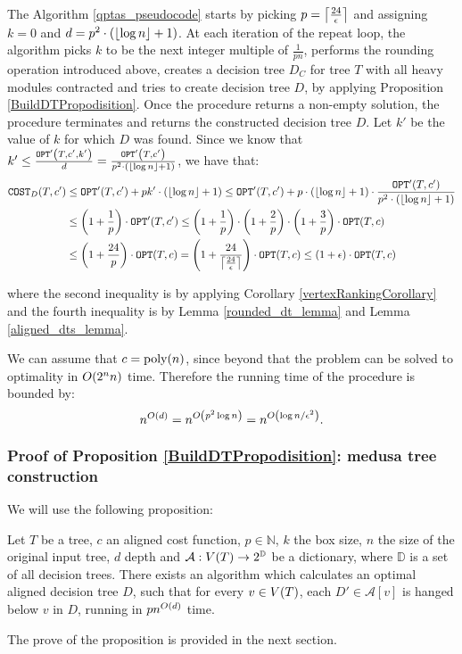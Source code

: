The Algorithm \ref{qptas_pseudocode} starts by picking $p=\mathopen{}\left\lceil \frac{24}{\epsilon} \right\rceil$ and assigning $k=0$ and $d=p^2\cdot\mathopen{}\left( \mathopen{}\left\lfloor \log n \right\rfloor+1 \right)$. At each iteration of the repeat loop, the algorithm picks $k$ to be the next 
integer multiple of $\frac{1}{pn}$, performs the rounding operation introduced above, creates a decision tree $D_C$ for tree $T$ with all heavy modules contracted and tries to create decision tree $D$, by applying Proposition \ref{BuildDTPropodisition}. Once the \FBuildDt procedure returns a non-empty solution, the \FQPTAS procedure terminates and returns the constructed decision tree $D$. Let $k'$ be the value of $k$ for which $D$ was found. Since we know that $k'\leq \frac{\texttt{OPT}'\mathopen{}\left( T,c',k' \right)}{d}=\frac{\texttt{OPT}'\mathopen{}\left( T,c' \right)}{p^2\cdot\mathopen{}\left( \mathopen{}\left\lfloor \log n \right\rfloor+1 \right)}$, we have that:
\begin{align*}
    \texttt{COST}_{D}\mathopen{}\left( T,c' \right)&\leq \texttt{OPT}'\mathopen{}\left( T,c' \right)+pk'\cdot \mathopen{}\left( \mathopen{}\left\lfloor \log n \right\rfloor+1 \right)\leq \texttt{OPT}'\mathopen{}\left( T,c' \right)+p\cdot \mathopen{}\left( \mathopen{}\left\lfloor \log n \right\rfloor+1 \right)\cdot \frac{\texttt{OPT}'\mathopen{}\left( T,c' \right)}{p^2\cdot\mathopen{}\left( \mathopen{}\left\lfloor \log n \right\rfloor+1 \right)} \\
    & \leq \mathopen{}\left( 1+\frac{1}{p} \right)\cdot\texttt{OPT}'\mathopen{}\left( T,c' \right)\leq \mathopen{}\left( 1+\frac{1}{p} \right)\cdot\mathopen{}\left( 1+\frac{2}{p} \right)\cdot\mathopen{}\left( 1+\frac{3}{p} \right)\cdot\texttt{OPT}\mathopen{}\left( T,c \right)
    \\&
    \leq \mathopen{}\left( 1+\frac{24}{p} \right)\cdot\texttt{OPT}\mathopen{}\left( T,c \right) = \mathopen{}\left( 1+\frac{24}{\mathopen{}\left\lceil \frac{24}{\epsilon} \right\rceil} \right)\cdot\texttt{OPT}\mathopen{}\left( T,c \right)\leq \mathopen{}\left( 1+\epsilon \right)\cdot \texttt{OPT}\mathopen{}\left( T,c \right)
\end{align*}
    
where the second inequality is by applying Corollary \ref{vertexRankingCorollary} and the fourth inequality is by Lemma \ref{rounded_dt_lemma} and Lemma \ref{aligned_dts_lemma}.

We can assume that $c=\text{poly}\mathopen{}\left( n \right)$, since beyond that the problem can be solved to optimality in $O\mathopen{}\left( 2^nn \right)$ time. Therefore the running time of the procedure is bounded by:
$$
n^{O\mathopen{}\left( d \right)}=n^{O\mathopen{}\left( p^2\log n \right)}=n^{O\mathopen{}\left( \log n/\epsilon^2 \right)}.
$$
\subsubsection{Proof of Proposition \ref{BuildDTPropodisition}: medusa tree construction}

We will use the following proposition:

\begin{proposition}\label{DPTimelinesCostsProposition}
    Let $T$ be a tree, $c$ an aligned cost function, $p\in \mathbb{N}$, $k$ the box size, $n$ the size of the original input tree, $d$ depth and $\mathcal{A}:V\mathopen{}\left( T \right)\to 2^{\mathbb{D}}$ be a dictionary, where $\mathbb{D}$ is a set of all decision trees. There exists an algorithm \FDPTimelinesCosts which calculates an optimal aligned decision tree $D$, such that for every $v\in V\mathopen{}\left( T \right)$, each $D'\in\mathcal{A}[v]$ is hanged below $v$ in $D$, running in $pn^{O\mathopen{}\left( d \right)}$ time.
\end{proposition}
The prove of the proposition is provided in the next section.

